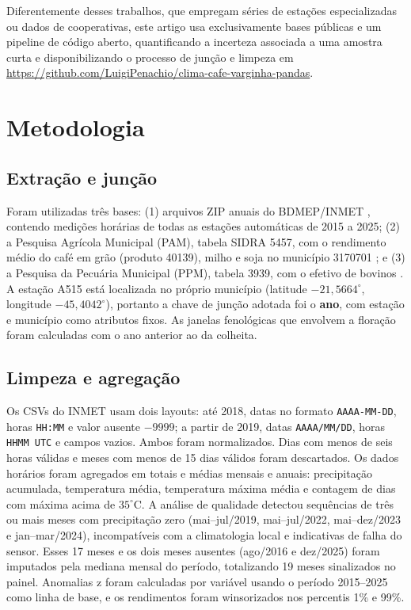 \documentclass[12pt]{article}
\begin{document}
Diferentemente desses trabalhos, que empregam s{\'e}ries de esta{\c{c}}{\~o}es
especializadas ou dados de cooperativas, este artigo usa exclusivamente bases
p{\'u}blicas e um pipeline de c{\'o}digo aberto, quantificando a incerteza associada a
uma amostra curta e disponibilizando o processo de junção e limpeza em \url{https://github.com/LuigiPenachio/clima-cafe-varginha-pandas}.

\section{Metodologia}

\subsection{Extra{\c{c}}{\~a}o e jun{\c{c}}{\~a}o}

Foram utilizadas tr{\^e}s bases: (1) arquivos ZIP anuais do BDMEP/INMET
\cite{inmet2026}, contendo medi{\c{c}}{\~o}es hor{\'a}rias de todas as esta{\c{c}}{\~o}es autom{\'a}ticas
de 2015 a 2025; (2) a Pesquisa Agr{\'i}cola Municipal (PAM), tabela SIDRA 5457, com o
rendimento m{\'e}dio do caf{\'e} em gr{\~a}o (produto 40139), milho e soja no munic{\'i}pio
3170701 \cite{ibgePAM2025}; e (3) a Pesquisa da Pecu{\'a}ria Municipal (PPM), tabela
3939, com o efetivo de bovinos \cite{ibgePPM2025}. A esta{\c{c}}{\~a}o A515 est{\'a} localizada
no pr{\'o}prio munic{\'i}pio (latitude $-21{,}5664^\circ$, longitude $-45{,}4042^\circ$),
portanto a chave de jun{\c{c}}{\~a}o adotada foi o \textbf{ano}, com esta{\c{c}}{\~a}o e
munic{\'i}pio como atributos fixos. As janelas fenol{\'o}gicas que envolvem a
flora{\c{c}}{\~a}o foram calculadas com o ano anterior ao da colheita.

\subsection{Limpeza e agrega{\c{c}}{\~a}o}

Os CSVs do INMET usam dois layouts: at{\'e} 2018, datas no formato
\texttt{AAAA-MM-DD}, horas \texttt{HH:MM} e valor ausente $-9999$; a partir de 2019,
datas \texttt{AAAA/MM/DD}, horas \texttt{HHMM UTC} e campos vazios. Ambos foram
normalizados. Dias com menos de seis horas v{\'a}lidas e meses com menos de 15 dias
v{\'a}lidos foram descartados. Os dados hor{\'a}rios foram agregados em totais e
m{\'e}dias mensais e anuais: precipita{\c{c}}{\~a}o acumulada, temperatura m{\'e}dia,
temperatura m{\'a}xima m{\'e}dia e contagem de dias com m{\'a}xima acima de $35^\circ$C.
A an{\'a}lise de qualidade detectou sequ{\^e}ncias de tr{\^e}s ou mais meses com
precipita{\c{c}}{\~a}o zero (mai--jul/2019, mai--jul/2022, mai--dez/2023 e
jan--mar/2024), incompat{\'i}veis com a climatologia local e indicativas de falha
do sensor. Esses 17 meses e os dois meses ausentes (ago/2016 e dez/2025) foram
imputados pela mediana mensal do per{\'i}odo, totalizando 19 meses sinalizados no
painel. Anomalias z foram calculadas por vari{\'a}vel usando o per{\'i}odo
2015--2025 como linha de base, e os rendimentos foram winsorizados nos percentis
1\% e 99\%.
\end{document}
